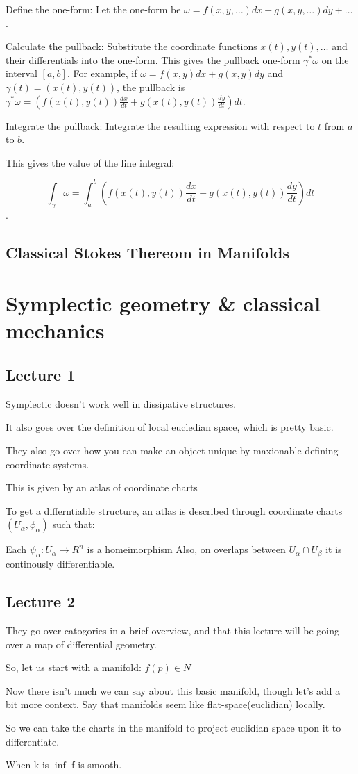 Define the one-form: Let the one-form be \(\omega =f(x,y,\dots )dx+g(x,y,\dots )dy+\dots \). 

Calculate the pullback: Substitute the coordinate functions \(x(t),y(t),\dots \) and their differentials into the one-form. This gives the pullback one-form \(\gamma ^{*}\omega \) on the interval \([a,b]\). For example, if \(\omega =f(x,y)dx+g(x,y)dy\) and \(\gamma (t)=(x(t),y(t))\), the pullback is \(\gamma ^{*}\omega =(f(x(t),y(t))\frac{dx}{dt}+g(x(t),y(t))\frac{dy}{dt})dt\).

Integrate the pullback: Integrate the resulting expression with respect to \(t\) from \(a\) to \(b\). 

This gives the value of the line integral: 

\[\int _{\gamma }\omega =\int _{a}^{b}(f(x(t),y(t))\frac{dx}{dt}+g(x(t),y(t))\frac{dy}{dt})dt\].

\subsection{Classical Stokes Thereom in Manifolds}

\section{Symplectic geometry & classical mechanics}
\subsection{Lecture 1}
Symplectic doesn't work well in dissipative structures.

It also goes over the definition of local eucledian space, which is pretty basic.

They also go over how you can make an object unique by maxionable defining coordinate systems. 

This is given by an atlas of coordinate charts 

To get a differntiable structure, an atlas is described through coordinate charts $(U_\alpha, \phi_\alpha)$ such that:

Each $\psi_\alpha: U_\alpha \to R^n$ is a homeimorphism
Also, on overlaps between $U_\alpha \cap U_\beta$ it is continously differentiable.

\subsection{Lecture 2}
They go over catogories in a brief overview, and that this lecture will be going over a map of differential geometry. 

So, let us start with a manifold: $ f(p)\in N$

Now there isn't much we can say about this basic manifold, though let's add a bit more context. Say that manifolds seem like flat-space(euclidian) locally.

So we can take the charts in the manifold to project euclidian space upon it to differentiate. 

When k is $\inf$ f is smooth. 
